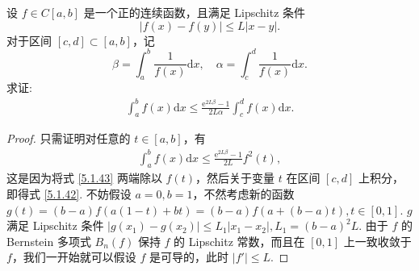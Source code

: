\documentclass[../../main.tex]{subfiles}
\begin{document}
\begin{example}
设 $f \in C[a,b]$ 是一个正的连续函数，且满足 Lipschitz 条件
$$|f(x) - f(y)| \leqslant L|x - y|.$$
对于区间 $[c,d] \subset [a,b]$，记
$$\beta = \int_a^b \frac{1}{f(x)} \mathrm{d}x, \quad \alpha = \int_c^d \frac{1}{f(x)} \mathrm{d}x.$$
求证:
\begin{align}
\int_a^b f(x) \mathrm{d}x \leqslant \frac{\mathrm{e}^{2L\beta} - 1}{2L\alpha} \int_c^d f(x) \mathrm{d}x. \label{5.1.42}
\end{align}
\end{example}
\begin{proof}
只需证明对任意的 $t \in [a,b]$，有
\begin{align}
\int_a^b f(x) \mathrm{d}x \leqslant \frac{\mathrm{e}^{2L\beta} - 1}{2L} f^2(t), \label{5.1.43}
\end{align}
这是因为将式 \eqref{5.1.43} 两端除以 $f(t)$，然后关于变量 $t$ 在区间 $[c,d]$ 上积分，即得式 \eqref{5.1.42}. 不妨假设 $a = 0, b = 1$，不然考虑新的函数 $g(t) =(b - a)f(a(1-t) + bt)= (b - a)f(a + (b - a)t), t \in [0,1]$. $g$ 满足 Lipschitz 条件 $|g(x_1) - g(x_2)| \leqslant L_1|x_1 - x_2|, L_1 = (b - a)^2L$. 由于 $f$ 的 Bernstein 多项式 $B_n(f)$ 保持 $f$ 的 Lipschitz 常数，而且在 $[0,1]$ 上一致收敛于 $f$，我们一开始就可以假设 $f$ 是可导的，此时 $|f'| \leqslant L$.


\end{proof}
\end{document}
